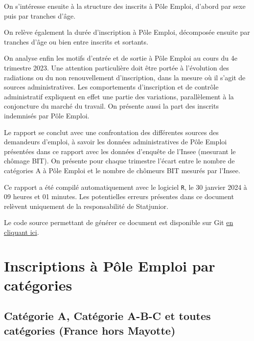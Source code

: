 \documentclass[
  paper=a4,
  ,captions=tableheading
]{scrartcl}
\begin{document}
On s'intéresse ensuite à la structure des inscrits à Pôle Emploi,
d'abord par sexe puis par tranches d'âge.

On relève également la durée d'inscription à Pôle Emploi, décomposée
ensuite par tranches d'âge ou bien entre inscrits et sortants.

On analyse enfin les motifs d'entrée et de sortie à Pôle Emploi au cours
du 4e trimestre 2023. Une attention particulière doit être portée à
l'évolution des radiations ou du non renouvellement d'inscription, dans
la mesure où il s'agit de sources administratives. Les comportements
d'inscription et de contrôle administratif expliquent en effet une
partie des variations, parallèlement à la conjoncture du marché du
travail. On présente aussi la part des inscrits indemnisés par Pôle
Emploi.

Le rapport se conclut avec une confrontation des différentes sources des
demandeurs d'emploi, à savoir les données administratives de Pôle Emploi
présentées dans ce rapport avec les données d'enquête de l'Insee
(mesurant le chômage BIT). On présente pour chaque trimestre l'écart
entre le nombre de catégories A à Pôle Emploi et le nombre de chômeurs
BIT mesurés par l'Insee.

Ce rapport a été compilé automatiquement avec le logiciel \texttt{R}, le
30 janvier 2024 à 09 heures et 01 minutes. Les potentielles erreurs
présentes dans ce document relèvent uniquement de la responsabilité de
Statjunior.

Le code source permettant de générer ce document est disponible sur Git
\href{https://github.com/statjunior/Statjunior/tree/main/Demandeurs\%20d\textquotesingle{}emploi\%20(Pole\%20Emploi)/}{en
cliquant ici}.

\hypertarget{inscriptions-uxe0-puxf4le-emploi-par-catuxe9gories}{%
\section{Inscriptions à Pôle Emploi par
catégories}\label{inscriptions-uxe0-puxf4le-emploi-par-catuxe9gories}}

\hypertarget{catuxe9gorie-a-catuxe9gorie-a-b-c-et-toutes-catuxe9gories-france-hors-mayotte}{%
\subsection{Catégorie A, Catégorie A-B-C et toutes catégories (France
hors
Mayotte)}\label{catuxe9gorie-a-catuxe9gorie-a-b-c-et-toutes-catuxe9gories-france-hors-mayotte}}
\end{document}

